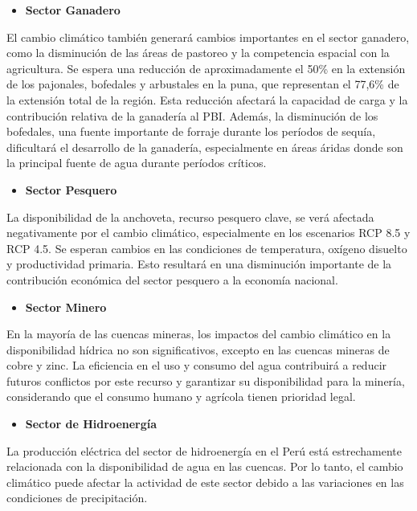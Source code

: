 \documentclass[
  letterpaper,
  DIV=11,
  numbers=noendperiod]{scrartcl}
\providecommand{\tightlist}{%
  \setlength{\itemsep}{0pt}\setlength{\parskip}{0pt}}\usepackage{longtable,booktabs,array}
\begin{document}
\begin{itemize}
\tightlist
\item
  \textbf{Sector Ganadero}
\end{itemize}

El cambio climático también generará cambios importantes en el sector
ganadero, como la disminución de las áreas de pastoreo y la competencia
espacial con la agricultura. Se espera una reducción de aproximadamente
el 50\% en la extensión de los pajonales, bofedales y arbustales en la
puna, que representan el 77,6\% de la extensión total de la región. Esta
reducción afectará la capacidad de carga y la contribución relativa de
la ganadería al PBI. Además, la disminución de los bofedales, una fuente
importante de forraje durante los períodos de sequía, dificultará el
desarrollo de la ganadería, especialmente en áreas áridas donde son la
principal fuente de agua durante períodos críticos.

\begin{itemize}
\tightlist
\item
  \textbf{Sector Pesquero}
\end{itemize}

La disponibilidad de la anchoveta, recurso pesquero clave, se verá
afectada negativamente por el cambio climático, especialmente en los
escenarios RCP 8.5 y RCP 4.5. Se esperan cambios en las condiciones de
temperatura, oxígeno disuelto y productividad primaria. Esto resultará
en una disminución importante de la contribución económica del sector
pesquero a la economía nacional.

\begin{itemize}
\tightlist
\item
  \textbf{Sector Minero}
\end{itemize}

En la mayoría de las cuencas mineras, los impactos del cambio climático
en la disponibilidad hídrica no son significativos, excepto en las
cuencas mineras de cobre y zinc. La eficiencia en el uso y consumo del
agua contribuirá a reducir futuros conflictos por este recurso y
garantizar su disponibilidad para la minería, considerando que el
consumo humano y agrícola tienen prioridad legal.

\begin{itemize}
\tightlist
\item
  \textbf{Sector de Hidroenergía}
\end{itemize}

La producción eléctrica del sector de hidroenergía en el Perú está
estrechamente relacionada con la disponibilidad de agua en las cuencas.
Por lo tanto, el cambio climático puede afectar la actividad de este
sector debido a las variaciones en las condiciones de precipitación.
\end{document}

